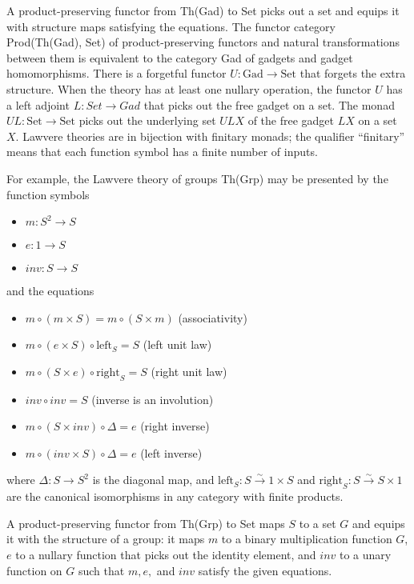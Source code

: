 \documentclass{article}
\newcommand{\maps}{\colon}
\newcommand{\Set}{\mathrm{Set}}
\newcommand{\Gad}{\mathrm{Gad}}
\begin{document}
A product-preserving functor from Th(Gad) to Set picks out a set and equips it with structure maps satisfying the equations.  The functor category Prod(Th(Gad), Set) of product-preserving functors and natural transformations between them is equivalent to the category Gad of gadgets and gadget homomorphisms.  There is a forgetful functor ${U\maps \Gad \to \Set}$ that forgets the extra structure.  When the theory has at least one nullary operation, the functor $U$ has a left adjoint ${L\maps Set \to Gad}$ that picks out the free gadget on a set.  The monad $UL\maps \Set \to \Set$ picks out the underlying set $ULX$ of the free gadget $LX$ on a set $X$.  Lawvere theories are in bijection with finitary monads; the qualifier ``finitary'' means that each function symbol has a finite number of inputs.

For example, the Lawvere theory of groups Th(Grp) may be presented by the function symbols
\begin{itemize}
  \item $m\maps S^2 \to S$
  \item $e\maps 1 \to S$
  \item $inv \maps S \to S$
\end{itemize}
and the equations
\begin{itemize}
  \item $m \circ (m \times S) = m \circ (S \times m)$ (associativity)
  \item $m \circ (e \times S) \circ \mathrm{left}_S = S$ (left unit law)
  \item $m \circ (S \times e) \circ \mathrm{right}_S = S$ (right unit law)
  \item $inv \circ inv = S$ (inverse is an involution)
  \item $m \circ (S \times inv) \circ \Delta = e$ (right inverse)
  \item $m \circ (inv \times S) \circ \Delta = e$ (left inverse)
\end{itemize}
where ${\Delta\maps S \to S^2}$ is the diagonal map, and ${\mathrm{left}_S\maps S \stackrel{\sim}{\to} 1 \times S}$ and ${\mathrm{right}_S\maps S \stackrel{\sim}{\to} S \times 1}$ are the canonical isomorphisms in any category with finite products.

A product-preserving functor from Th(Grp) to Set maps $S$ to a set $G$ and equips it with the structure of a group: it maps $m$ to a binary multiplication function $G$, $e$ to a nullary function that picks out the identity element, and $inv$ to a unary function on $G$ such that $m, e,$ and $inv$ satisfy the given equations.
\end{document}
